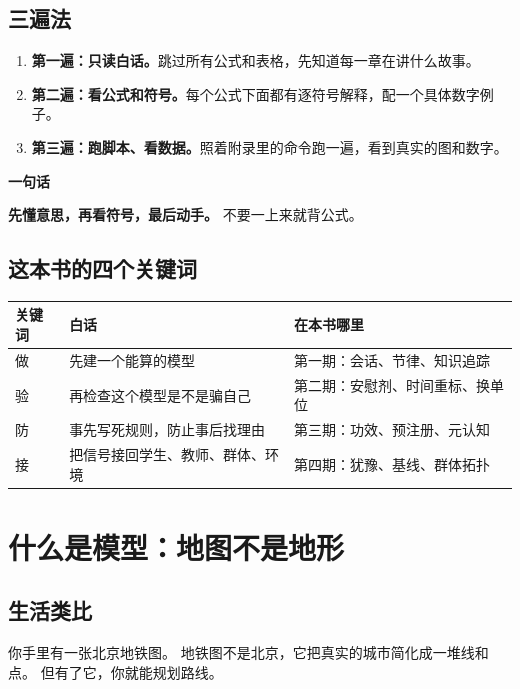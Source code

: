 \documentclass[UTF8,a4paper,11pt]{ctexart}
\newenvironment{explainbox}[1]
{\begin{center}\begin{minipage}{0.94\textwidth}\colorbox{boxbg}{\parbox{0.92\textwidth}{\textbf{#1}\par\vspace{2pt}}}}
{\end{minipage}\end{center}}
\begin{document}
\subsection{三遍法}

\begin{enumerate}[leftmargin=2em]
\item \textbf{第一遍：只读白话。}跳过所有公式和表格，先知道每一章在讲什么故事。
\item \textbf{第二遍：看公式和符号。}每个公式下面都有逐符号解释，配一个具体数字例子。
\item \textbf{第三遍：跑脚本、看数据。}照着附录里的命令跑一遍，看到真实的图和数字。
\end{enumerate}

\begin{explainbox}{一句话}
\textbf{先懂意思，再看符号，最后动手。}
不要一上来就背公式。
\end{explainbox}

\subsection{这本书的四个关键词}

\begin{center}
\begin{longtable}{@{}p{2.4cm}p{4.6cm}p{6.8cm}@{}}
\toprule
\textbf{关键词} & \textbf{白话} & \textbf{在本书哪里} \\
\midrule
做 & 先建一个能算的模型 & 第一期：会话、节律、知识追踪 \\
验 & 再检查这个模型是不是骗自己 & 第二期：安慰剂、时间重标、换单位 \\
防 & 事先写死规则，防止事后找理由 & 第三期：功效、预注册、元认知 \\
接 & 把信号接回学生、教师、群体、环境 & 第四期：犹豫、基线、群体拓扑 \\
\bottomrule
\end{longtable}
\end{center}


\section{什么是模型：地图不是地形}

\subsection{生活类比}

你手里有一张北京地铁图。
地铁图不是北京，它把真实的城市简化成一堆线和点。
但有了它，你就能规划路线。
\end{document}

